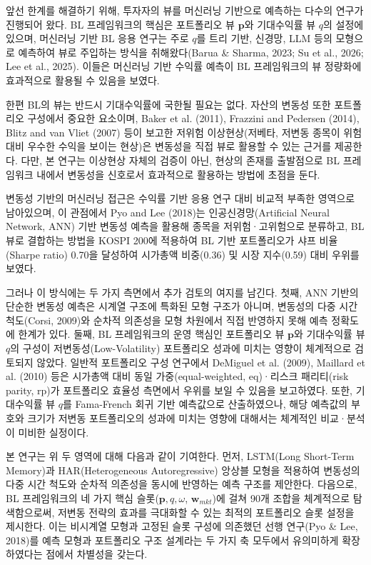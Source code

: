 \documentclass{article}
\begin{document}
앞선 한계를 해결하기 위해, 투자자의 뷰를 머신러닝 기반으로 예측하는 다수의 연구가 진행되어 왔다. BL 프레임워크의 핵심은 포트폴리오 뷰 $\mathbf{p}$와 기대수익률 뷰 $q$의 설정에 있으며, 머신러닝 기반 BL 응용 연구는 주로 $q$를 트리 기반, 신경망, LLM 등의 모형으로 예측하여 뷰로 주입하는 방식을 취해왔다(Barua & Sharma, 2023; Su et al., 2026; Lee et al., 2025). 이들은 머신러닝 기반 수익률 예측이 BL 프레임워크의 뷰 정량화에 효과적으로 활용될 수 있음을 보였다.

한편 BL의 뷰는 반드시 기대수익률에 국한될 필요는 없다. 자산의 변동성 또한 포트폴리오 구성에서 중요한 요소이며, Baker et al. (2011), Frazzini and Pedersen (2014), Blitz and van Vliet (2007) 등이 보고한 저위험 이상현상(저베타, 저변동 종목이 위험 대비 우수한 수익을 보이는 현상)은 변동성을 직접 뷰로 활용할 수 있는 근거를 제공한다. 다만, 본 연구는 이상현상 자체의 검증이 아닌, 현상의 존재를 출발점으로 BL 프레임워크 내에서 변동성을 신호로서 효과적으로 활용하는 방법에 초점을 둔다.

변동성 기반의 머신러닝 접근은 수익률 기반 응용 연구 대비 비교적 부족한 영역으로 남아있으며, 이 관점에서 Pyo and Lee (2018)는 인공신경망(Artificial Neural Network, ANN) 기반 변동성 예측을 활용해 종목을 저위험·고위험으로 분류하고, BL 뷰로 결합하는 방법을 KOSPI 200에 적용하여 BL 기반 포트폴리오가 샤프 비율(Sharpe ratio) 0.70을 달성하여 시가총액 비중(0.36) 및 시장 지수(0.59) 대비 우위를 보였다.

그러나 이 방식에는 두 가지 측면에서 추가 검토의 여지를 남긴다. 첫째, ANN 기반의 단순한 변동성 예측은 시계열 구조에 특화된 모형 구조가 아니며, 변동성의 다중 시간 척도(Corsi, 2009)와 순차적 의존성을 모형 차원에서 직접 반영하지 못해 예측 정확도에 한계가 있다. 둘째, BL 프레임워크의 운영 핵심인 포트폴리오 뷰 $\mathbf{p}$와 기대수익률 뷰 $q$의 구성이 저변동성(Low-Volatility) 포트폴리오 성과에 미치는 영향이 체계적으로 검토되지 않았다. 일반적 포트폴리오 구성 연구에서 DeMiguel et al. (2009), Maillard et al. (2010) 등은 시가총액 대비 동일 가중(equal-weighted, eq)·리스크 패리티(risk parity, rp)가 포트폴리오 효율성 측면에서 우위를 보일 수 있음을 보고하였다. 또한, 기대수익률 뷰 $q$를 Fama-French 회귀 기반 예측값으로 산출하였으나, 해당 예측값의 부호와 크기가 저변동 포트폴리오의 성과에 미치는 영향에 대해서는 체계적인 비교·분석이 미비한 실정이다. 

본 연구는 위 두 영역에 대해 다음과 같이 기여한다. 먼저, LSTM(Long Short-Term Memory)과 HAR(Heterogeneous Autoregressive) 앙상블 모형을 적용하여 변동성의 다중 시간 척도와 순차적 의존성을 동시에 반영하는 예측 구조를 제안한다. 다음으로, BL 프레임워크의 네 가지 핵심 슬롯($\mathbf{p}, q, \omega$, $\mathbf{w}_{mkt}$)에 걸쳐 90개 조합을 체계적으로 탐색함으로써, 저변동 전략의 효과를 극대화할 수 있는 최적의 포트폴리오 슬롯 설정을 제시한다. 이는 비시계열 모형과 고정된 슬롯 구성에 의존했던 선행 연구(Pyo & Lee, 2018)를 예측 모형과 포트폴리오 구조 설계라는 두 가지 축 모두에서 유의미하게 확장하였다는 점에서 차별성을 갖는다.
\end{document}
